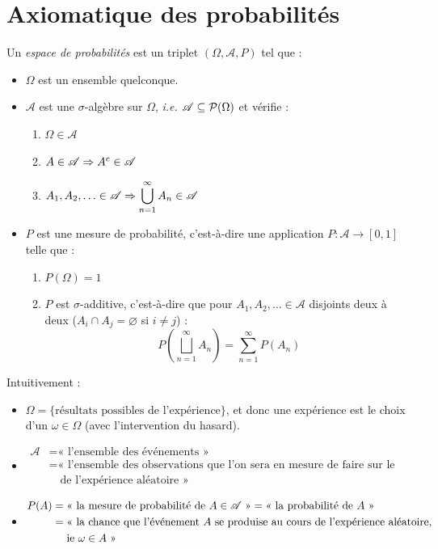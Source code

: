\section{Axiomatique des probabilités}



\begin{definition}
    Un \emph{espace de probabilités} est un triplet $(\Omega, \mathscr A, P)$ tel que :
    \begin{itemize}
        \item $\Omega$ est un ensemble quelconque.
        \item $\mathscr A$ est une $\sigma$-algèbre sur $\Omega$, \textit{i.e.} $\mathscr A\subseteq \mathcal{P}(\Omega)$ et vérifie :
        \begin{enumerate}
            \item $\Omega\in\mathscr A$
            \item $A\in\mathscr A \Rightarrow A^c\in\mathscr A$
            \item $\displaystyle A_1,A_2,\dotsc\in\mathscr A \Rightarrow \bigcup_{n=1}^\infty A_n\in\mathscr A$
        \end{enumerate}
        \item $P$ est une mesure de probabilité, c'est-à-dire une application $P: \mathscr A \to [0,1]$ telle que :
        \begin{enumerate}
            \item $P(\Omega)=1$
            \item $P$ est $\sigma$-additive, c'est-à-dire que pour $A_1,A_2,\dots\in \mathscr A$ disjoints deux à deux ($A_i\cap A_j= \varnothing$ si $i\neq j$) :
            \[
            P\left(\bigsqcup_{n=1}^{\infty}A_n\right) = \sum_{n=1}^{\infty}P(A_n)
            \]
        \end{enumerate}
    \end{itemize}
    
    Intuitivement :
    \begin{itemize}
        \item $\Omega = \{\text{résultats possibles de l'expérience}\}$, et donc une expérience est le choix d'un $\omega\in\Omega$ (avec l'intervention du hasard).
        \item \begin{align*}
            \mathscr A &= \text{« l'ensemble des événements »}\\
            &= \text{« l'ensemble des observations que l'on sera en mesure de faire sur le résultat}\\
            &\quad \text{de l'expérience aléatoire »}
        \end{align*}
        \item \begin{align*}
            P(A) &= \text{« la mesure de probabilité de $A\in\mathscr{A}$ »} = \text{« la probabilité de $A$ »}\\
            &= \text{« la chance que l'événement $A$ se produise au cours de l'expérience aléatoire,}\\
            &\quad \text{ ie $\omega\in A$ »}
        \end{align*}
    \end{itemize}
\end{definition}
